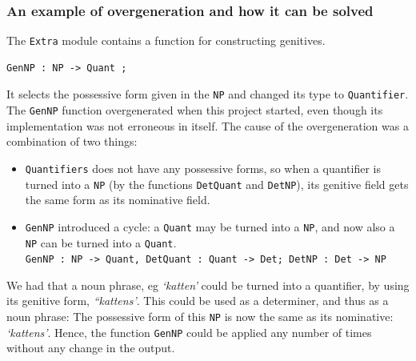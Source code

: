 \documentclass{report}
\begin{document}




\subsubsection{An example of overgeneration and how it can be solved}
The \verb-Extra- module contains a function for constructing genitives.
\begin{verbatim}GenNP : NP -> Quant ;\end{verbatim}
It selects the possessive form given in the \verb-NP- and changed its type
to \verb-Quantifier-. 
The \verb-GenNP- function %
overgenerated when this project started, even
though its implementation was not erroneous in itself. The cause of the overgeneration 
was a combination of two things:
\begin{itemize}
\item \verb-Quantifiers- does not have any possessive
forms, so when a quantifier is turned into
a \verb-NP- (by the functions \verb-DetQuant- and \verb-DetNP-), its genitive field gets
the same form as its nominative field.
\item\verb-GenNP-
introduced a cycle: a \verb-Quant- may be turned into a \verb-NP-, and now also
a \verb-NP- can be turned into a \verb-Quant-.\\
\verb|GenNP : NP -> Quant, DetQuant : Quant -> Det; DetNP : Det -> NP|
\end{itemize}
We had that a noun phrase, eg \emph{`katten'} could be turned into a quantifier,
by using its genitive form, \emph{``kattens'}. This could be used as a determiner,
and thus as a noun phrase:
The possessive form of this \verb-NP- is now the same as its nominative:
\emph{`kattens'}. Hence, the function \verb-GenNP- could be applied
any number of times without any change in the output.
\end{document}
